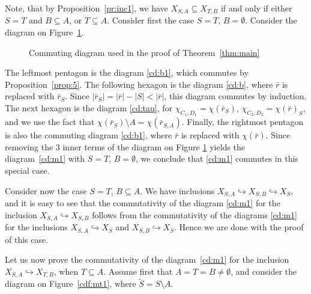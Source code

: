 \documentclass{amsart}[10pt]
\newcommand{\es}{\emptyset}
\newcommand{\hra}{\hookrightarrow}
\newcommand{\sm}{\setminus}
\newcommand{\tr}{{\bar r}}
\newcommand{\wti}{\widetilde}
\numberwithin{equation}{section}
\numberwithin{figure}{section}
\numberwithin{table}{section}
\begin{document}
Note, that by Proposition~\ref{pr:inc1}, we have $X_{S,A}\subseteq
X_{T,B}$ if and only if either $S=T$ and $B\subseteq A$, or
$T\subseteq A$.  Consider first the case $S=T$, $B=\es$. Consider the
diagram on Figure~\ref{cdf:m2}.
\begin{figure}[hbt]
\caption{Commuting diagram used in the proof of Theorem~\ref{thm:main}}
\label{cdf:m2}
\end{figure}
The leftmost pentagon is the diagram \eqref{cd:b1}, which commutes by
Proposition~\ref{prop:5}. The following hexagon is the diagram
\eqref{cd:b}, where $\tr$ is replaced with $\tr_S$. Since
$|\tr_S|=|\tr|-|S|<|\tr|$, this diagram commutes by induction. The
next hexagon is the diagram \eqref{cd:tau}, for
$\chi_{C_1,D_1}=\chi(\tr_S)$, $\chi_{C_2,D_2}=\chi(\tr)_S$, and we use
the fact that $\chi(\tr_S)\sm A=\chi(\tr_{S,A})$. Finally, the
rightmost pentagon is also the commuting diagram \eqref{cd:b1}, where
$\tr$ is replaced with $\chi(\tr)$. Since removing the $3$ inner terms
of the diagram on Figure \ref{cdf:m2} yields the diagram~\eqref{cd:m1} with
$S=T$, $B=\es$, we conclude that \eqref{cd:m1} commutes in this
special case.

Consider now the case $S=T$, $B\subseteq A$. We have inclusions
$X_{S,A}\hra X_{S,B}\hra X_{S}$, and it is easy to see that the
commutativity of the diagram \eqref{cd:m1} for the inclusion
$X_{S,A}\hra X_{S,B}$ follows from the commutativity of the diagrams
\eqref{cd:m1} for the inclusions $X_{S,A}\hra X_S$ and $X_{S,B}\hra
X_S$. Hence we are done with the proof of this case.

Let us now prove the commutativity of the diagram~\eqref{cd:m1} for
the inclusion $X_{S,A}\hra X_{T,B}$, when $T\subseteq A$.
Assume first that $A=T=B\neq\es$, and consider the diagram on Figure~\ref{cdf:mt1}, where $\wti S=S\sm A$.
\end{document}
